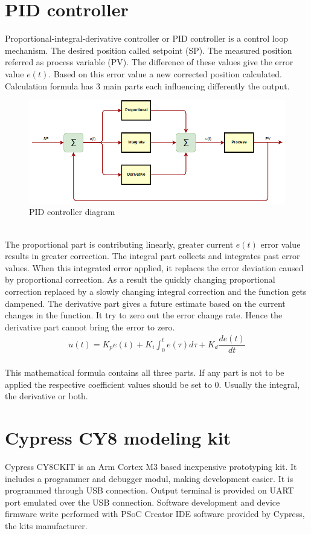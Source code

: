 \documentclass[11pt,a4paper,oneside,article]{memoir}
\begin{document}
\section{PID controller}
Proportional-integral-derivative controller or PID controller is a control loop mechanism. The desired position called setpoint (SP). The measured position referred as process variable (PV). The difference of these values give the error value $ e(t) $. Based on this error value a new corrected position calculated. Calculation formula has 3 main parts each influencing differently the output.\\
\begin{figure}[h]
	\centering
	\includegraphics[width=12cm]{illustration/PID_controller}
	\caption[]{PID controller diagram}
	\label{fig:pidcontroller}
\end{figure}
\\
The proportional part is contributing linearly, greater current $ e(t) $ error value results in greater correction.
The integral part collects and integrates past error values. When this integrated error applied, it replaces the error deviation caused by proportional correction. As a result the quickly changing proportional correction replaced by a slowly changing integral correction and the function gets dampened.
The derivative part gives a future estimate based on the current changes in the function. It try to zero out the error change rate. Hence the derivative part cannot bring the error to zero.\\
\begin{align}
u(t) = K_{p}e(t) + K_{i} \int_{0}^{t} e(\tau)d\tau + K_{d} \dfrac{de(t)}{dt}
\end{align}
\\
This mathematical formula contains all three parts. If any part is not to be applied the respective coefficient values should be set to 0. Usually the integral, the derivative or both.
\cite{wikipedia:PID}
\cite{Lectures}

\section{Cypress CY8 modeling kit}
Cypress CY8CKIT is an Arm Cortex M3 based inexpensive prototyping kit. It includes a programmer and debugger modul, making development easier. It is programmed through USB connection. Output terminal is provided on UART port emulated over the USB connection. Software development and device firmware write performed with PSoC Creator IDE software provided by Cypress, the kits manufacturer.\cite{cy8ckit}
\end{document}
